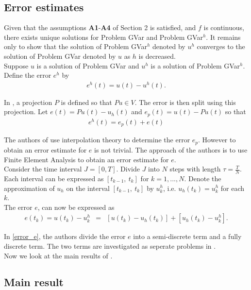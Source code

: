 \documentclass[../../main.tex]{subfiles}
\begin{document}
\subsection{Error estimates}\label{e_est}
Given that the assumptions \textbf{A1}-\textbf{A4} of Section 2 is satisfied, and $f$ is continuous, there exists unique solutions for  Problem GVar and Problem GVar$^h$. It remains only to show that the solution of Problem GVar$^h$ denoted by $u^h$ converges to the solution of Problem GVar denoted by $u$ as $h$ is decreased.\\

Suppose $u$ is a solution of Problem GVar and $u^h$ is a solution of Problem GVar$^h$. Define the error $e^h$ by
\begin{eqnarray*}
	e^h(t) = u(t) - u^h(t).
\end{eqnarray*}

In \cite{BV13}, a projection $P$ is defined so that $Pu \in V$. The error is then split using this projection. Let $e(t) = Pu(t)- u_h(t)$ and $e_p(t) = u(t) - Pu(t)$ so that
\begin{eqnarray}
	e^h(t) = e_p(t) +e(t) \label{Error}
\end{eqnarray}

The authors of \cite{BV13} use interpolation theory to determine the error $e_p$. However to obtain an error estimate for $e$ is not trivial. The approach of the authors is to use Finite Element Analysis to obtain an error estimate for $e$.\\

Consider the time interval $J = [0,T]$. Divide $J$ into $N$ steps with length $\tau = \frac{T}{N}$. Each interval can be expressed as $[t_{k-1}, \ t_k]$ for $k = 1,...,N$. Denote the approximation of $u_h$ on the interval $[t_{k-1}, \ t_k]$ by $u_k^h$, i.e. $u_h(t_k) = u_k^h$ for each $k$.\\

The error $e$, can now be expressed as
\begin{eqnarray}
	e(t_k) = u(t_k) - u^h_k & = & [u(t_k)-u_h(t_k)] + [u_h(t_k) - u^h_k]. \label{error_e}
\end{eqnarray}

In \eqref{error_e}, the authors divide the error $e$ into a semi-discrete term and a fully discrete term. The two terms are investigated as seperate problems in \cite{BV13}.\\


Now we look at the main results of \cite{BV13}.
\subsection{Main result}
\end{document}
